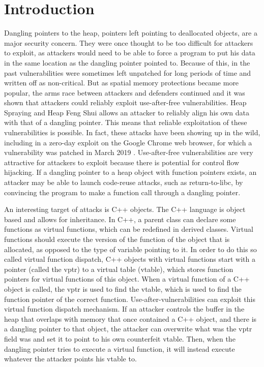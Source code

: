 \documentclass[conference]{IEEEtran}
\begin{document}
\section{Introduction}
Dangling pointers to the heap, pointers left pointing to deallocated objects, 
are a major security concern. They were once thought to be too difficult for 
attackers to exploit, as attackers would need to be able to force a program 
to put his data in the same location as the dangling pointer pointed to. 
Because of this, in the past vulnerabilities were sometimes left unpatched 
for long periods of time and written off as non-critical. But as spatial 
memory protections became more popular, the arms race between attackers and 
defenders continued and it was shown that attackers could reliably exploit 
use-after-free vulnerabilities. Heap Spraying and Heap Feng Shui allows an 
attacker to reliably align his own data with that of a dangling pointer. 
This means that reliable exploitation of these vulnerabilities is possible. 
In fact, these attacks have been showing up in the wild, including 
in a zero-day exploit on the Google Chrome web browser, for which a 
vulnerability was patched in March 2019  \cite{b6}. Use-after-free vulnerabilities are 
very attractive for attackers to exploit because there is potential for 
control flow hijacking. If a dangling pointer to a heap object with 
function pointers exists, an attacker may be able to launch code-reuse 
attacks, such as return-to-libc, by convincing the program to make a 
function call through a dangling pointer.  

An interesting target of attacks is C++ objects.  The C++ language is object based and 
allows for inheritance. In C++, a parent class can declare some functions 
as virtual functions, which can be redefined in derived classes. Virtual 
functions should execute the version of the function of the object that 
is allocated, as opposed to the type of variable pointing to it. In order 
to do this so called virtual function dispatch, C++ objects with virtual 
functions start with a pointer (called the vptr) to a virtual table 
(vtable), which stores function pointers for virtual functions of this 
object. When a virtual function of a C++ object is called, the vptr is 
used to find the vtable, which is used to find the function pointer of 
the correct function. Use-after-vulnerabilities can exploit this virtual 
function dispatch mechanism. If an attacker controls the buffer in the 
heap that overlaps with memory that once contained a C++ object, and 
there is a dangling pointer to that object, the attacker can overwrite 
what was the vptr field was and set it to point to his own counterfeit 
vtable. Then, when the dangling pointer tries to execute a virtual 
function, it will instead execute whatever the attacker points his vtable 
to. 
\end{document}
